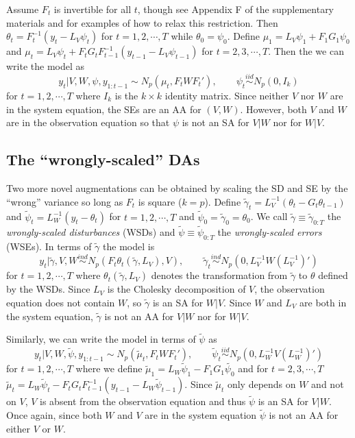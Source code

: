 \documentclass[12pt]{article}
\begin{document}
Assume $F_t$ is invertible for all $t$, though see Appendix F of the supplementary materials and \blind \citet{simpson2014app} \fi for examples of how to relax this restriction. Then $\theta_t = F_t^{-1}(y_t - L_V\psi_t)$ for $t=1,2,\cdots,T$ while $\theta_0=\psi_0$. Define $\mu_1 = L_V\psi_1 + F_1G_1\psi_0$ and $\mu_t =L_V\psi_t + F_tG_tF_{t-1}^{-1}(y_{t-1} - L_{V}\psi_{t-1})$ for $t=2,3,\cdots,T$. Then the we can write the model as \vspace{-.3cm}
\[
  y_t|V,W,\psi,y_{1:t-1} \sim N_p(\mu_t, F_tWF_t'), \qquad \psi_t  \stackrel{iid}{\sim} N_p(0,I_k)
\]
for $t=1,2,\cdots,T$ where $I_k$ is the $k\times k$ identity matrix. Since neither $V$ nor $W$ are in the system equation, the SEs are an AA for $(V,W)$. However, both $V$ and $W$ are in the observation equation so that $\psi$ is not an SA for $V|W$ nor for $W|V$.

\subsection{The ``wrongly-scaled'' DAs}
Two more novel augmentations can be obtained by scaling the SD and SE by the ``wrong'' variance so long as $F_t$ is square ($k=p$). Define $\tilde{\gamma}_t=L_V^{-1}(\theta_t - G_t\theta_{t-1})$ and $\tilde{\psi}_t=L_W^{-1}(y_t - \theta_t)$ for $t=1,2,\cdots,T$ and $\tilde{\psi}_0=\tilde{\gamma}_0=\theta_0$. We call $\tilde{\gamma}\equiv\tilde{\gamma}_{0:T}$ the {\it wrongly-scaled disturbances} (WSDs) and $\tilde{\psi}\equiv\tilde{\psi}_{0:T}$ the {\it wrongly-scaled errors} (WSEs). In terms of $\tilde{\gamma}$ the model is \vspace{-.3cm}
\[
  y_t|\tilde{\gamma},V,W \stackrel{ind}{\sim} N_p\left(F_t\theta_t(\tilde{\gamma},L_V), V\right), \qquad  
  \tilde{\gamma}_t \stackrel{ind}{\sim}N_p(0,L_V^{-1}W(L_V^{-1})')
\]
for $t=1,2,\cdots,T$ where $\theta_t(\tilde{\gamma},L_V)$ denotes the transformation from $\tilde{\gamma}$ to $\theta$ defined by the WSDs. Since $L_V$ is the Cholesky decomposition of $V$, the observation equation does not contain $W$, so $\tilde{\gamma}$ is an SA for $W|V$. Since $W$ and $L_V$ are both in the system equation, $\tilde{\gamma}$ is not an AA for $V|W$ nor for $W|V$. 

Similarly, we can write the model in terms of $\tilde{\psi}$ as \vspace{-.3cm}
\[
  y_t|V,W,\tilde{\psi},y_{1:t-1} \sim N_p(\tilde{\mu}_t, F_tWF_t'), \qquad 
  \tilde{\psi}_t  \stackrel{iid}{\sim} N_p(0,L_W^{-1}V(L_W^{-1})')
\]
for $t=1,2,\cdots,T$ where we define $\tilde{\mu}_1 = L_W\tilde{\psi}_1 - F_1G_1\tilde{\psi_0}$ and for $t=2,3,\cdots,T$ $\tilde{\mu}_t =L_W\tilde{\psi}_t - F_tG_tF_{t-1}^{-1}(y_{t-1} - L_{W}\tilde{\psi}_{t-1})$. Since $\tilde{\mu}_t$ only depends on $W$ and not on $V$, $V$ is absent from the observation equation and thus $\tilde{\psi}$ is an SA for $V|W$. Once again, since both $W$ and $V$ are in the system equation $\tilde{\psi}$ is not an AA for either $V$ or $W$.
\end{document}
